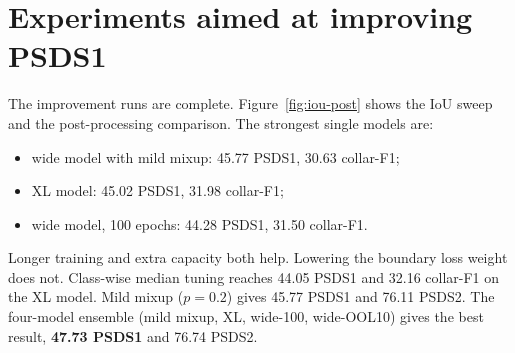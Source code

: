 \section{Experiments aimed at improving PSDS1}

The improvement runs are complete. Figure~\ref{fig:iou-post} shows the IoU
sweep and the post-processing comparison. The strongest single models are:
\begin{itemize}
\item wide model with mild mixup: 45.77 PSDS1, 30.63 collar-F1;
\item XL model: 45.02 PSDS1, 31.98 collar-F1;
\item wide model, 100 epochs: 44.28 PSDS1, 31.50 collar-F1.
\end{itemize}
Longer training and extra capacity both help. Lowering the boundary loss weight
does not. Class-wise median tuning reaches 44.05 PSDS1 and 32.16 collar-F1 on
the XL model. Mild mixup ($p=0.2$) gives 45.77 PSDS1 and 76.11 PSDS2. The
four-model ensemble (mild mixup, XL, wide-100, wide-OOL10) gives the best
result, \textbf{47.73 PSDS1} and 76.74 PSDS2.
